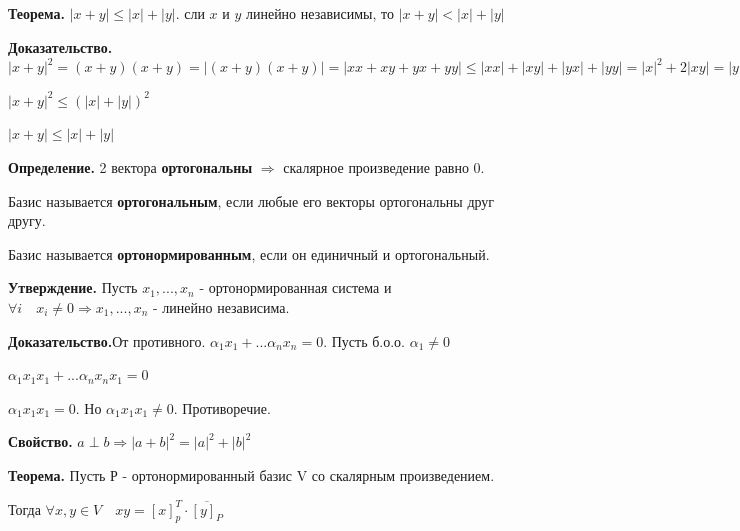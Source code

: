 \documentclass[a4paper]{article}
\begin{document}
\begin{htheorem}
\textbf{Теорема.} $|x+y| \leq |x|+|y|$. сли $x$ и $y$ линейно независимы, то $|x+y| < |x|+ |y|$
\end{htheorem}

\begin{hproof}
\textbf{Доказательство.} 
$|x+y|^2 = (x+y)(x+y) = |(x+y)(x+y)| = |xx+xy+yx+yy| \leq |xx| + |xy| + |yx| + |yy| = |x|^2 + 2|xy| = |y|^2 \leq |x|^2 + 2|x||y| + |y|^2 = (|x| + |y|)^2$

$|x+y|^2 \leq (|x| + |y|)^2$

$|x+y| \leq |x| + |y|$
\end{hproof}

\newpage \begin{center}\begin{Large}\end{Large}\end{center}

\textbf{Определение.} 2 вектора \textbf{ортогональны} $\Rightarrow$ скалярное произведение равно 0.

Базис называется \textbf{ортогональным}, если любые его векторы ортогональны друг другу.

Базис называется \textbf{ортонормированным}, если он единичный и ортогональный.

\begin{htheorem}
\textbf{Утверждение.} Пусть $x_1, ..., x_n$ - ортонормированная система и $\forall i \quad x_i \neq 0 \Rightarrow x_1, ..., x_n$ - линейно независима.
\end{htheorem}

\begin{hproof}
\textbf{Доказательство.}От противного. $\alpha_1 x_1 + ... \alpha_n x_n = 0$. Пусть б.о.о. $\alpha_1 \neq 0$

$\alpha_1 x_1 x_1 + ... \alpha_n x_n x_1 = 0$

$\alpha_1 x_1 x_1 = 0$. Но $\alpha_1 x_1 x_1 \neq 0$. Противоречие.
\end{hproof}


\begin{htheorem}
\textbf{Свойство.} $a \perp b \Rightarrow |a+b|^2 = |a|^2 + |b|^2$
\end{htheorem}

\begin{htheorem}
\textbf{Теорема.} Пусть Р - ортонормированный базис V со скалярным произведением. 

Тогда $\forall x, y \in V \quad xy = [x]_p^T \cdot \overline{[y]_P}$
\end{htheorem}
\end{document}
